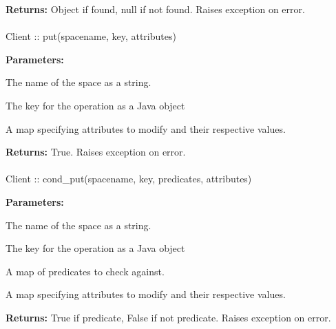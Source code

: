 \noindent\textbf{Returns:}
Object if found, null if not found.  Raises exception on error.

\paragraph{}
\label{api:java:put}
\begin{javacode}
Client :: put(spacename, key, attributes)
\end{javacode}
\funcdesc 

\noindent\textbf{Parameters:}
\begin{description}[labelindent=\widthof{{\code{attributes}}},leftmargin=*,noitemsep,nolistsep,align=right]
\item[\code{spacename}] The name of the space as a string.
\item[\code{key}] The key for the operation as a Java object
\item[\code{attributes}] A map specifying attributes to modify and their respective values.
\end{description}

\noindent\textbf{Returns:}
True.  Raises exception on error.

\paragraph{}
\label{api:java:cond_put}
\begin{javacode}
Client :: cond_put(spacename, key, predicates, attributes)
\end{javacode}
\funcdesc 

\noindent\textbf{Parameters:}
\begin{description}[labelindent=\widthof{{\code{predicates}}},leftmargin=*,noitemsep,nolistsep,align=right]
\item[\code{spacename}] The name of the space as a string.
\item[\code{key}] The key for the operation as a Java object
\item[\code{predicates}] A map of predicates to check against.
\item[\code{attributes}] A map specifying attributes to modify and their respective values.
\end{description}

\noindent\textbf{Returns:}
True if predicate, False if not predicate.  Raises exception on error.

